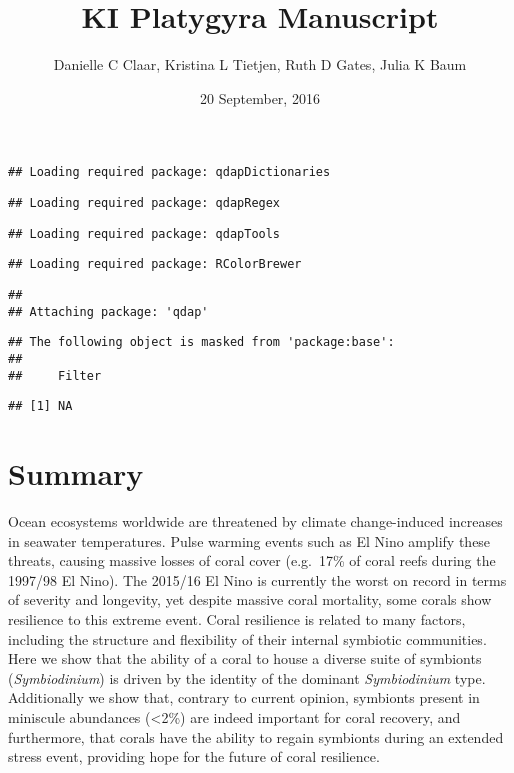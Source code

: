 \documentclass[]{article}
\title{KI Platygyra Manuscript}
\author{Danielle C Claar, Kristina L Tietjen, Ruth D Gates, Julia K Baum}
\date{20 September, 2016}
\begin{document}
\maketitle

\begin{verbatim}
## Loading required package: qdapDictionaries
\end{verbatim}

\begin{verbatim}
## Loading required package: qdapRegex
\end{verbatim}

\begin{verbatim}
## Loading required package: qdapTools
\end{verbatim}

\begin{verbatim}
## Loading required package: RColorBrewer
\end{verbatim}

\begin{verbatim}
## 
## Attaching package: 'qdap'
\end{verbatim}

\begin{verbatim}
## The following object is masked from 'package:base':
## 
##     Filter
\end{verbatim}

\begin{verbatim}
## [1] NA
\end{verbatim}

\section{Summary}\label{summary}

Ocean ecosystems worldwide are threatened by climate change-induced
increases in seawater temperatures. Pulse warming events such as El Nino
amplify these threats, causing massive losses of coral cover (e.g.~17\%
of coral reefs during the 1997/98 El Nino). The 2015/16 El Nino is
currently the worst on record in terms of severity and longevity, yet
despite massive coral mortality, some corals show resilience to this
extreme event. Coral resilience is related to many factors, including
the structure and flexibility of their internal symbiotic communities.
Here we show that the ability of a coral to house a diverse suite of
symbionts (\emph{Symbiodinium}) is driven by the identity of the
dominant \emph{Symbiodinium} type. Additionally we show that, contrary
to current opinion, symbionts present in miniscule abundances
(\textless{}2\%) are indeed important for coral recovery, and
furthermore, that corals have the ability to regain symbionts during an
extended stress event, providing hope for the future of coral
resilience.
\end{document}
